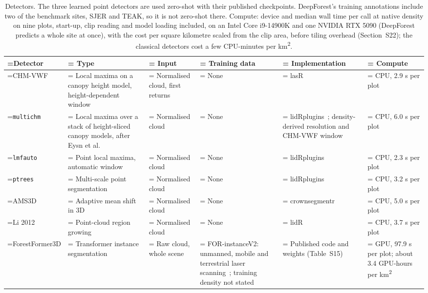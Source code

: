\documentclass[journal]{IEEEtran}
\begin{document}
\begin{table}[!tp]
\caption{Detectors. The three learned point detectors are used zero-shot
with their published checkpoints. DeepForest's training annotations include two
of the benchmark sites, SJER and TEAK, so it is not zero-shot there. Compute:
device and median wall time per call at native density on nine plots, start-up,
clip reading and model loading included, on an Intel Core i9-14900K and one
NVIDIA RTX 5090 (DeepForest predicts a whole site at once), with the cost per
square kilometre scaled from the clip area, before tiling overhead (Section~S22); the classical detectors cost a few CPU-minutes per km\textsuperscript{2}.}
\label{tab:2}
\centering
\scriptsize
\setlength{\tabcolsep}{3pt}
\renewcommand{\arraystretch}{1.15}
\begin{tabularx}{\textwidth}{>{\hsize\linewidth=\hsize}L>{\hsize\linewidth=\hsize}L>{\hsize\linewidth=\hsize}L>{\hsize\linewidth=\hsize}L>{\hsize\linewidth=\hsize}L>{\hsize\linewidth=\hsize}L}
\hline
Detector & Type & Input & Training data & Implementation & Compute \\
\hline
CHM-VWF & Local maxima on a canopy height model, height-dependent window~\cite{popescu2004seeing} & Normalised cloud, first returns & None & lasR~\cite{roussel2026lasr} & CPU, 2.9 s per plot \\
\texttt{multichm} & Local maxima over a stack of height-sliced canopy models, after Eysn et al.~\cite{eysn2015benchmark} & Normalised cloud & None & lidRplugins~\cite{roussel2023lidrplugins}; density-derived resolution and CHM-VWF window & CPU, 6.0 s per plot \\
\texttt{lmfauto} & Point local maxima, automatic window & Normalised cloud & None & lidRplugins & CPU, 2.3 s per plot \\
\texttt{ptrees} & Multi-scale point segmentation~\cite{vega2014ptrees} & Normalised cloud & None & lidRplugins & CPU, 3.2 s per plot \\
AMS3D & Adaptive mean shift in 3D~\cite{ferraz2016lidar} & Normalised cloud & None & crownsegmentr~\cite{steinmeier2025crownsegmentr} & CPU, 5.0 s per plot \\
Li 2012 & Point-cloud region growing~\cite{li2012new} & Normalised cloud & None & lidR~\cite{roussel2020lidr} & CPU, 3.7 s per plot \\
ForestFormer3D & Transformer instance segmentation~\cite{xiang2025forestformer3d} & Raw cloud, whole scene & FOR-instanceV2: unmanned, mobile and terrestrial laser scanning~\cite{xiang2025forinstancev2}; training density not stated & Published code and weights (Table~S15) & GPU, 97.9 s per plot; about 3.4 GPU-hours per km\textsuperscript{2} \\

\end{tabularx}
\end{table}
\end{document}
